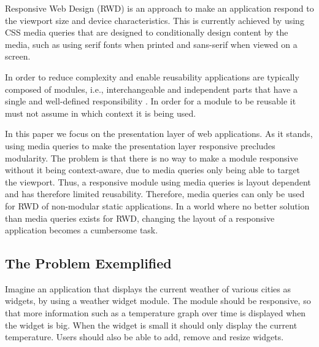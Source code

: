 \documentclass{acm_proc_article-sp}
\begin{document}
  Responsive Web Design (RWD) is an approach to make an application respond to the viewport size and device characteristics.
  This is currently achieved by using CSS media queries that are designed to conditionally design content by the media, such as using serif fonts when printed and sans-serif when viewed on a screen.

  In order to reduce complexity and enable reusability applications are typically composed of modules, i.e., interchangeable and independent parts that have a single and well-defined responsibility \cite{parnas1972criteria}.
  In order for a module to be reusable it must not assume in which context it is being used.

  In this paper we focus on the presentation layer of web applications.
  As it stands, using media queries to make the presentation layer responsive precludes modularity.
  The problem is that there is no way to make a module responsive without it being context-aware, due to media queries only being able to target the viewport.
  Thus, a responsive module using media queries is layout dependent and has therefore limited reusability.
  Therefore, media queries can only be used for RWD of non-modular static applications.
  In a world where no better solution than media queries exists for RWD, changing the layout of a responsive application becomes a cumbersome task.

  \subsection{The Problem Exemplified}
    
    Imagine an application that displays the current weather of various cities as widgets, by using a weather widget module.
    The module should be responsive, so that more information such as a temperature graph over time is displayed when the widget is big.
    When the widget is small it should only display the current temperature.
    Users should also be able to add, remove and resize widgets.
\end{document}
